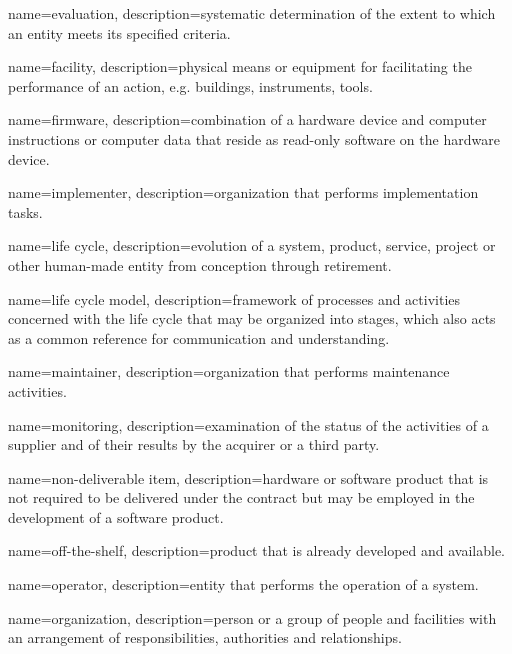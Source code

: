 {
	name=evaluation,
	description={systematic determination of the extent to which an entity meets its specified criteria.}
}



{
	name=facility,
	description={physical means or equipment for facilitating the performance of an action, e.g. buildings, instruments, tools.}
}

{
	name=firmware,
	description={combination of a hardware device and computer instructions or computer data that reside as read-only software on the hardware device.}
}



{
	name=implementer,
	description={organization that performs implementation tasks.}
}



{
	name=life cycle,
	description={evolution of a system, product, service, project or other human-made entity from conception through retirement.}
}

{
	name=life cycle model,
	description={framework of processes and activities concerned with the life cycle that may be organized into stages, which also acts as a common reference for communication and understanding.}
}



{
	name=maintainer,
	description={organization that performs maintenance activities.}
}

{
	name=monitoring,
	description={examination of the status of the activities of a supplier and of their results by the acquirer or a third party.}
}



{
	name=non-deliverable item,
	description={hardware or software product that is not required to be delivered under the contract but may be employed in the development of a software product.}
}



{
	name=off-the-shelf,
	description={product that is already developed and available.}
}

{
	name=operator,
	description={entity that performs the operation of a system.}
}

{
	name=organization,
	description={person or a group of people and facilities with an arrangement of responsibilities, authorities and relationships.}
}



